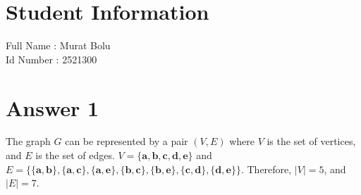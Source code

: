 \documentclass[12pt]{article}
\begin{document}
\section*{Student Information } 
Full Name : Murat Bolu \\
Id Number : 2521300 \\

\section*{Answer 1}

The graph $G$ can be represented by a pair $(V, E)$ where $V$ is the set of vertices, and $E$ is the set of edges.
$V = \{\textbf{a}, \textbf{b}, \textbf{c}, \textbf{d}, \textbf{e}\}$ and $E = \{\{\textbf{a}, \textbf{b}\}, \{\textbf{a}, \textbf{c}\}, \{\textbf{a}, \textbf{e}\}, \{\textbf{b}, \textbf{c}\}, \{\textbf{b}, \textbf{e}\}, \{\textbf{c}, \textbf{d}\}, \{\textbf{d}, \textbf{e}\}\}$.
Therefore, $|V| = 5$, and $|E| = 7$.
\end{document}
